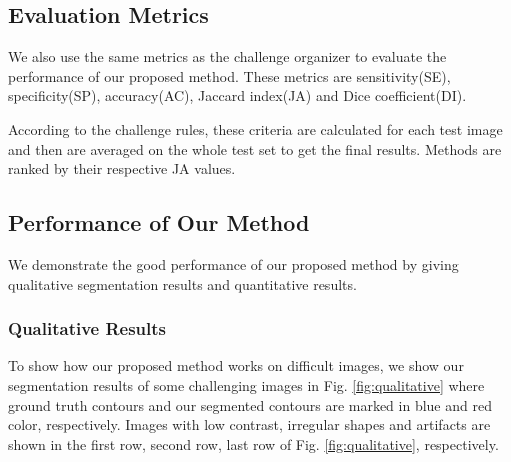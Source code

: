 \documentclass{article}
\begin{document}
\subsection{Evaluation Metrics}
We also use the same metrics as the challenge organizer to evaluate the performance of our proposed method. These metrics are sensitivity(SE), specificity(SP), accuracy(AC), Jaccard index(JA) and Dice coefficient(DI). 

According to the challenge rules,
these criteria are calculated for each test image and then are averaged
on the whole test set to get the final
results. Methods are ranked by their respective JA values.

\subsection{Performance of Our Method}
We demonstrate the good performance of our proposed method by giving qualitative segmentation results and quantitative results.
\subsubsection{Qualitative Results}
To show how our proposed method works on difficult images, we show our segmentation results of some challenging images in Fig. \ref{fig:qualitative} where ground truth contours and our segmented contours are marked in blue and red color, respectively. Images with low contrast, irregular shapes and artifacts are shown in the first row, second row, last row of Fig. \ref{fig:qualitative}, respectively. 
\end{document}
